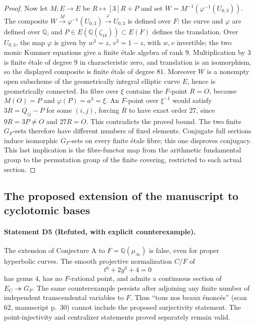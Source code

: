 \begin{proof}
Now let $M:E\to E$ be $R\mapsto[3]R+P$ and set
$W=M^{-1}(\varphi^{-1}(U_{0,3}))$.  The composite
$W\xrightarrow{M}\varphi^{-1}(U_{0,3})\xrightarrow{\varphi}U_{0,3}$
is defined over $F$: the curve and $\varphi$ are defined over $\mathbb Q$,
and $P\in E(\mathbb Q(\zeta_{18}))\subset E(F)$ defines the translation.
Over $U_{0,3}$, the map $\varphi$ is given by
$w^3=z$, $v^3=1-z$, with $w,v$ invertible; the two monic Kummer
equations give a finite \'etale algebra of rank $9$.
Multiplication by $3$ is finite \'etale of degree $9$ in characteristic
zero, and translation is an isomorphism, so the displayed composite is
finite \'etale of degree $81$.  Moreover $W$ is a nonempty open
subscheme of the geometrically integral elliptic curve $E$, hence is
geometrically connected.  Its fibre over $\xi$ contains the $F$-point
$R=O$, because $M(O)=P$ and $\varphi(P)=a^3=\xi$.
An $F$-point over $\xi^{-1}$ would satisfy
$3R=Q_{ij}-P$ for some $(i,j)$, forcing $R$ to have exact order $27$,
since $9R=3P\ne O$ and $27R=O$.  This contradicts the proved bound.
The two finite $G_F$-sets therefore have
different numbers of fixed elements.  Conjugate full sections induce
isomorphic $G_F$-sets on every finite \'etale fibre; this one disproves
conjugacy.  This last implication is the fibre-functor map from the
arithmetic fundamental group to the permutation group of the finite
covering, restricted to each actual section.
\end{proof}

\subsection{The proposed extension of the manuscript to cyclotomic bases}

\paragraph{Statement D5 (Refuted, with explicit counterexample).}\label{res:D5}
The extension of Conjecture A to $F=\mathbb Q(\mu_\infty)$ is false,
even for proper hyperbolic curves.  The smooth projective normalization
$C/F$ of
\[
                         t^6+2y^3+4=0
\]
has genus $4$, has no $F$-rational point, and admits a continuous section
of $E_C\twoheadrightarrow G_F$.  The same counterexample persists after
adjoining any finite number of independent transcendental variables to
$F$.  Thus ``tous nos beaux \'enonc\'es'' (scan 62, manuscript p.~30) cannot include
the proposed surjectivity statement.  The point-injectivity and centralizer
statements proved separately remain valid.

